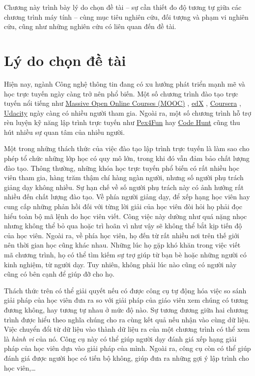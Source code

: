 Chương này trình bày lý do chọn đề tài -- sự cần thiết đo độ tương tự
giữa các chương trình máy tính -- cùng mục tiêu nghiên cứu, đối tượng và phạm
vi nghiên cứu, cũng như những nghiên cứu có liên quan đến đề tài.

\section{Lý do chọn đề tài}

Hiện nay, ngành Công nghệ thông tin đang có xu hướng phát triển mạnh
mẽ và học trực tuyến ngày càng trở nên phổ biến. Một số chương trình
đào tạo trực tuyến nổi tiếng như
\href{https://www.coursera.org/course/saas}{Massive Open Online
  Courses (MOOC)} \cite{mooc}, \href{https://www.edx.org/}{edX}
\cite{edx}, \href{https://www.coursera.org/}{Coursera}
\cite{coursera}, \href{http://www.udacity.com/}{Udacity}
\cite{Udacity} ngày càng có nhiều người tham gia. Ngoài ra, một số
chương trình hỗ trợ rèn luyện kỹ năng lập trình trực tuyến như
\href{https://www.pexforfun.com/}{Pex4Fun} \cite{Pex4Fun} hay
\href{https://www.microsoft.com/en-us/research/project/code-hunt/}{Code
  Hunt} \cite{CodeHunt} cũng thu hút nhiều sự quan tâm của nhiều
người. 

Một trong những thách thức của việc đào tạo lập trình trực tuyến là
làm sao cho phép tổ chức những lớp học có quy mô lớn, trong khi đó vẫn
đảm bảo chất lượng đào tạo. Thông thường, những khóa học trực tuyến
phổ biến có rất nhiều học viên tham gia, hàng trăm thậm chí hàng ngàn
người, nhưng số người phụ trách giảng dạy không nhiều. Sự hạn chế về
số người phụ trách này có ảnh hưởng rất nhiều đến chất lượng đào
tạo. Về phía người giảng dạy, để xếp hạng học viên hay cung cấp những
phản hồi đối với từng lời giải của học viên đòi hỏi họ phải đọc hiểu
toàn bộ mã lệnh do học viên viết. Công việc này dường như quá nặng
nhọc nhưng không thể bỏ qua hoặc trì hoãn vì như vậy sẽ không thể bắt
kịp tiến độ của học viên. Ngoài ra, về phía học viên, họ đến từ rất
nhiều nơi trên thế giới nên thời gian học cũng khác nhau. Những lúc họ
gặp khó khăn trong việc viết mã chương trình, họ có thể tìm kiếm sự
trợ giúp từ bạn bè hoặc những người có kinh nghiệm, từ người dạy. Tuy
nhiên, không phải lúc nào cũng có người này cũng có bên cạnh để giúp
đỡ cho họ.

Thách thức trên có thể giải quyết nếu có được công cụ tự động hóa việc
so sánh giải pháp của học viên đưa ra so với giải pháp của giáo viên
xem chúng có tương đương không, hay tương tự nhau ở mức độ nào. Sự
tương đương giữa hai chương trình được hiểu theo nghĩa chúng cho ra
cùng kết quả nếu nhận vào cùng dữ liệu. Việc chuyển đổi từ dữ liệu vào
thành dữ liệu ra của một chương trình có thể xem là \emph{hành vi} của
nó. Công cụ này có thể giúp người dạy đánh giá xếp hạng giải pháp của
học viên dựa vào giải pháp của mình. Ngoài ra, công cụ còn có thể giúp
đánh giá được người học có tiến bộ không, giúp đưa ra những gợi ý lập
trình cho học viên,\dots


